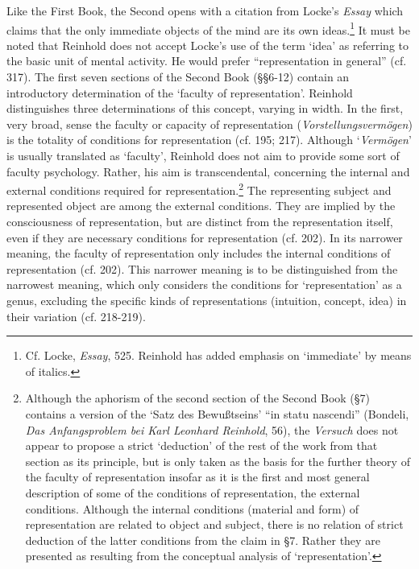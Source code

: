 Like the First Book, the Second opens with a citation from Locke's \textit{Essay} which claims that the only immediate objects of the mind are its own ideas.\footnote{ Cf. Locke, \textit{Essay}, 525. Reinhold has added emphasis on `immediate' by means of italics. } It must be noted that Reinhold does not accept Locke's use of the term `idea' as referring to the basic unit of mental activity. He would prefer ``representation in general'' (cf. 317). The first seven sections of the Second Book (\S \S  6{-}12) contain an introductory determination of the `faculty of representation'. Reinhold distinguishes three determinations of this concept, varying in width. In the first, very broad, sense the faculty or capacity of representation (\textit{Vorstellungsverm\"{o}gen}) is the totality of conditions for representation (cf. 195; 217). Although `\textit{Verm\"{o}gen}' is usually translated as `faculty', Reinhold does not aim to provide some sort of faculty psychology. Rather, his aim is transcendental, concerning the internal and external conditions required for representation.\footnote{\label{footnote:_Ref229468623} Although the aphorism of the second section of the Second Book (\S  7) contains a version of the `Satz des Bewu\ss{}tseins' ``in statu nascendi'' (Bondeli, \textit{Das Anfangsproblem bei Karl Leonhard Reinhold}, 56), the \textit{Versuch }does not appear to propose a strict `deduction' of the rest of the work from that section as its principle, but is only taken as the basis for the further theory of the faculty of representation insofar as it is the first and most general description of some of the conditions of representation, the external conditions. Although the internal conditions (material and form) of representation are related to object and subject, there is no relation of strict deduction of the latter conditions from the claim in \S  7. Rather they are presented as resulting from the conceptual analysis of `representation'. } The representing subject and represented object are among the external conditions. They are implied by the consciousness of representation, but are distinct from the representation itself, even if they are necessary conditions for representation (cf. 202). In its narrower meaning, the faculty of representation only includes the internal conditions of representation (cf. 202). This narrower meaning is to be distinguished from the narrowest meaning, which only considers the conditions for `representation' as a genus, excluding the specific kinds of representations (intuition, concept, idea) in their variation (cf. 218{-}219).

